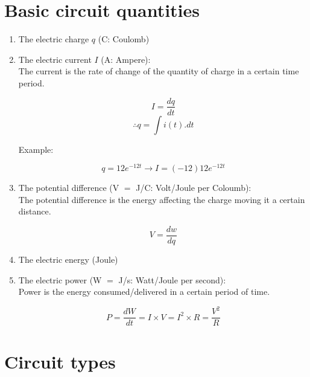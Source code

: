 \documentclass[a4paper]{book}
\begin{document}
\newpage
\section{Basic circuit quantities}

\begin{enumerate}

  \item The electric charge $q$ (C: Coulomb)

  \item The electric current $I$ (A: Ampere):\\
    The current is the rate of change of the quantity of charge in a certain time period.

    \[I = \frac{dq}{dt}\]
    \[\therefore q = \int i(t).dt\]

    Example:

    \[q = 12e^{-12t} \to I = (-12)12e^{-12t}\]

  \item The potential difference (V $=$ J/C: Volt/Joule per Coloumb):\\
    The potential difference is the energy affecting the charge moving it a certain distance.

    \[V = \frac{dw}{dq}\]

  \item The electric energy (Joule)

  \item The electric power (W $=$ J/s: Watt/Joule per second):\\
    Power is the energy consumed/delivered in a certain period of time.

    \[P = \frac{dW}{dt} = I \times V = I^{2} \times R = \frac{V^2}{R}\]

\end{enumerate}

\section{Circuit types}
\end{document}
